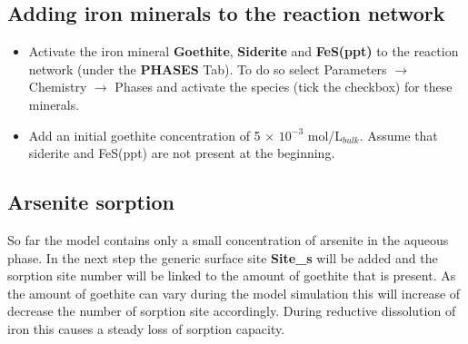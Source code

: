 \subsection[Adding iron minerals to the reaction network]{Adding iron minerals to the reaction network} 

\begin{itemize}
\item Activate the iron mineral {\color{red} \textbf{Goethite}}, {\color{red} \textbf{Siderite}} 
and {\color{red} \textbf{FeS(ppt)}} to the reaction network (under the {\color{red} \textbf{PHASES}} Tab).
To do so select Parameters $\rightarrow$ Chemistry $\rightarrow$ Phases and 
activate the species (tick the checkbox) for these minerals. 

\item Add an initial goethite concentration of 5 $\times$ $10^{-3}$ mol/L$_{bulk}$. Assume that siderite and FeS(ppt) are not present at the beginning. 

\end{itemize}

\subsection[Arsenite sorption]{Arsenite sorption} 

So far the model contains only a small concentration of arsenite in the aqueous phase. 
In the next step the generic surface site {\color{red} \textbf{Site\_s}} will be added and the
sorption site number will be linked to the amount of goethite that is present. As the amount of goethite can vary during the model simulation this will increase of decrease the number of sorption site accordingly. 
During reductive dissolution of iron this causes a steady loss of sorption capacity.   

